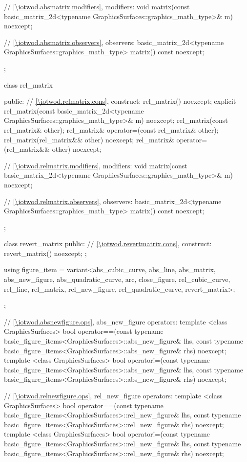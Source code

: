 \begin{codeblock}
{{{      // \ref{\iotwod.absmatrix.modifiers}, modifiers:
      void matrix(const basic_matrix_2d<typename
        GraphicsSurfaces::graphics_math_type>& m) noexcept;
	
      // \ref{\iotwod.absmatrix.observers}, observers:
      basic_matrix_2d<typename GraphicsSurfaces::graphics_math_type> matrix() const noexcept;
    };

    class rel_matrix {
    public:
      // \ref{\iotwod.relmatrix.cons}, construct:
      rel_matrix() noexcept;
      explicit rel_matrix(const basic_matrix_2d<typename
        GraphicsSurfaces::graphics_math_type>& m) noexcept;
      rel_matrix(const rel_matrix& other);
      rel_matrix& operator=(const rel_matrix& other);
      rel_matrix(rel_matrix&& other) noexcept;
      rel_matrix& operator=(rel_matrix&& other) noexcept;

      // \ref{\iotwod.relmatrix.modifiers}, modifiers:
      void matrix(const basic_matrix_2d<typename
        GraphicsSurfaces::graphics_math_type>& m) noexcept;
	
      // \ref{\iotwod.relmatrix.observers}, observers:
      basic_matrix_2d<typename GraphicsSurfaces::graphics_math_type> matrix() const noexcept;
    };

    class revert_matrix {
    public:
      // \ref{\iotwod.revertmatrix.cons}, construct:
      revert_matrix() noexcept;
    };

    using figure_item = variant<abs_cubic_curve, abs_line, abs_matrix, abs_new_figure,
      abs_quadratic_curve, arc, close_figure, rel_cubic_curve, rel_line, rel_matrix,
      rel_new_figure, rel_quadratic_curve, revert_matrix>;
  };

  // \ref{\iotwod.absnewfigure.ops}, abs_new_figure operators:
  template <class GraphicsSurfaces>
  bool operator==(const typename basic_figure_items<GraphicsSurfaces>::abs_new_figure& lhs,
    const typename basic_figure_items<GraphicsSurfaces>::abs_new_figure& rhs) noexcept;
  template <class GraphicsSurfaces>
  bool operator!=(const typename basic_figure_items<GraphicsSurfaces>::abs_new_figure& lhs,
    const typename basic_figure_items<GraphicsSurfaces>::abs_new_figure& rhs) noexcept;
  
  // \ref{\iotwod.relnewfigure.ops}, rel_new_figure operators:
  template <class GraphicsSurfaces>
  bool operator==(const typename basic_figure_items<GraphicsSurfaces>::rel_new_figure& lhs,
    const typename basic_figure_items<GraphicsSurfaces>::rel_new_figure& rhs) noexcept;
  template <class GraphicsSurfaces>
  bool operator!=(const typename basic_figure_items<GraphicsSurfaces>::rel_new_figure& lhs,
    const typename basic_figure_items<GraphicsSurfaces>::rel_new_figure& rhs) noexcept;

}
\end{codeblock}
